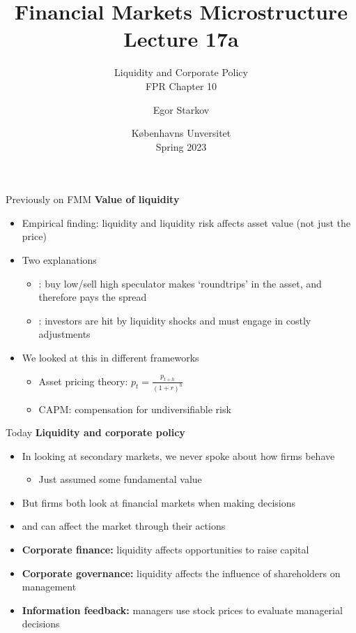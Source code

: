 \documentclass[english,10pt
,aspectratio=169
]{beamer}
\title{Financial Markets Microstructure \\ Lecture 17a}
\subtitle{Liquidity and Corporate Policy \\ FPR Chapter 10}
\author{Egor Starkov}
\date{K{\o}benhavns Unversitet \\
	Spring 2023}
\begin{document}
\frame[plain]{\titlepage}


\begin{frame}{Previously on FMM}
	\textbf{Value of liquidity}
	\begin{itemize}
		\item Empirical finding: liquidity and liquidity risk affects asset value (not just the price)
		\item Two explanations
		\begin{itemize}
			\item {}: buy low/sell high speculator makes `roundtrips' in the asset, and therefore pays the spread
			\item {}: investors are hit by liquidity shocks and must engage in costly adjustments
		\end{itemize}
		\item We looked at this in different frameworks
		\begin{itemize}
			\item \alert{Asset pricing theory}: $p_{t}= \frac{p_{t+h}}{(1+r)^{h}}$
			\item \alert{CAPM}: compensation for undiversifiable risk
		\end{itemize}
	\end{itemize}
\end{frame}


\begin{frame}{Today}
	\textbf{Liquidity and corporate policy}
	\begin{itemize}
		\item In looking at secondary markets, we never spoke about how firms behave
		\begin{itemize}
			\item Just assumed some fundamental value
		\end{itemize}
		\item But firms both look at financial markets when making decisions
		\item and can affect the market through their actions
		\pause\bigskip 
		\item \textbf{Corporate finance:} liquidity affects opportunities to raise capital
		\item \textbf{Corporate governance:} liquidity affects the influence of shareholders on management
		\item \textbf{Information feedback:} managers use stock prices to evaluate managerial decisions
	\end{itemize}
\end{frame}
\end{document}
